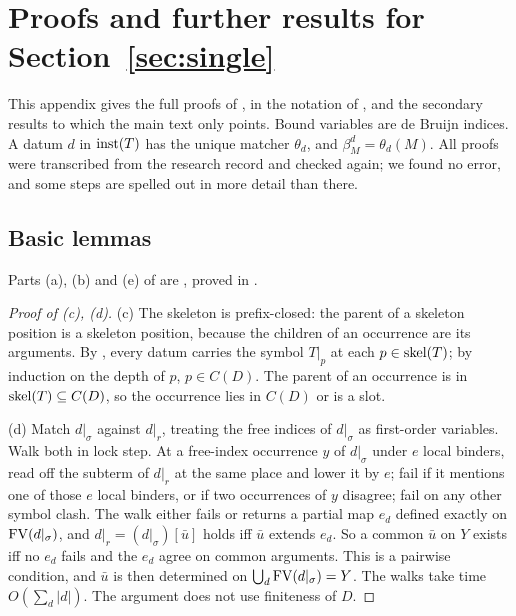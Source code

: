 
\section{Proofs and further results for Section~\ref{sec:single}}\label{app:single}

This appendix gives the full proofs of , in the notation of , and the secondary results to which the main text only points. Bound variables are de Bruijn indices. A datum $d$ in $\mathrm{inst}(T)$ has the unique matcher $\theta_d$, and $\beta^d_M=\theta_d(M)$. All proofs were transcribed from the research record and checked again; we found no error, and some steps are spelled out in more detail than there.

\subsection{Basic lemmas}\label{app:single:basic}

Parts (a), (b) and (e) of  are , proved in .

\begin{proof}[Proof of (c), (d)]
(c) The skeleton is prefix-closed: the parent of a skeleton position is a skeleton position, because the children of an occurrence are its arguments. By , every datum carries the symbol $T|_p$ at each $p\in\mathrm{skel}(T)$; by induction on the depth of $p$, $p\in C(D)$. The parent of an occurrence is in $\mathrm{skel}(T)\subseteq C(D)$, so the occurrence lies in $C(D)$ or is a slot.

(d) Match $d|_\sigma$ against $d|_r$, treating the free indices of $d|_\sigma$ as first-order variables. Walk both in lock step. At a free-index occurrence $y$ of $d|_\sigma$ under $e$ local binders, read off the subterm of $d|_r$ at the same place and lower it by $e$; fail if it mentions one of those $e$ local binders, or if two occurrences of $y$ disagree; fail on any other symbol clash. The walk either fails or returns a partial map $e_d$ defined exactly on $\mathrm{FV}(d|_\sigma)$, and $d|_r=(d|_\sigma)[\bar u]$ holds iff $\bar u$ extends $e_d$. So a common $\bar u$ on $Y$ exists iff no $e_d$ fails and the $e_d$ agree on common arguments. This is a pairwise condition, and $\bar u$ is then determined on $\bigcup_d\mathrm{FV}(d|_\sigma)=Y$. The walks take time $O(\sum_d|d|)$. The argument does not use finiteness of $D$.
\end{proof}

